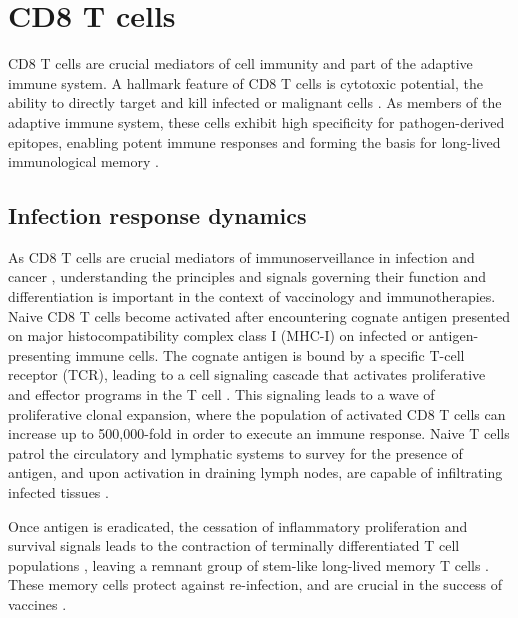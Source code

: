 

\section{CD8 T cells}

CD8 T cells are crucial mediators of cell immunity and part of the adaptive immune system. A hallmark feature of CD8 T cells is cytotoxic potential, the ability to directly target and kill infected or malignant cells \citep{chungArchitecturalDesignCD82021, raskovCytotoxicCD8Cells2021}. As members of the adaptive immune system, these cells exhibit high specificity for pathogen-derived epitopes, enabling potent immune responses and forming the basis for long-lived immunological memory \citep{altan-bonnet916SystemsImmunology2012, kaechEffectorMemoryTcell2002}.

\subsection{Infection response dynamics}
As CD8 T cells are crucial mediators of immunoserveillance in infection and cancer \citep{steinertQuantifyingMemoryCD82015, marelli-bergHighwayCodeCell2008}, understanding the principles and signals governing their function and differentiation is important in the context of vaccinology and immunotherapies. Naive CD8 T cells become activated after encountering cognate antigen presented on major histocompatibility complex class I (MHC-I) on infected or antigen-presenting immune cells. The cognate antigen is bound by a specific T-cell receptor (TCR), leading to a cell signaling cascade that activates proliferative and effector programs in the T cell \citep{jrImmunobiology2001}. This signaling leads to a wave of proliferative clonal expansion, where the population of activated CD8 T cells can increase up to 500,000-fold \citep{zhangCD8CellsFoot2011} in order to execute an immune response. Naive T cells patrol the circulatory and lymphatic systems to survey for the presence of antigen, and upon activation in draining lymph nodes, are capable of infiltrating infected tissues \citep{marelli-bergHighwayCodeCell2008}.

Once antigen is eradicated, the cessation of inflammatory proliferation and survival signals leads to the contraction of terminally differentiated T cell populations \citep{dcruzSurvivingCrashTransitioning2009}, leaving a remnant group of stem-like long-lived memory T cells \citep{goldrathMolecularProgramInduced2004, luckeyMemoryMemoryCells2006}. These memory cells protect against re-infection, and are crucial in the success of vaccines \citep{wherryMemoryCD8TCell2004, kaechEffectorMemoryTcell2002}.

